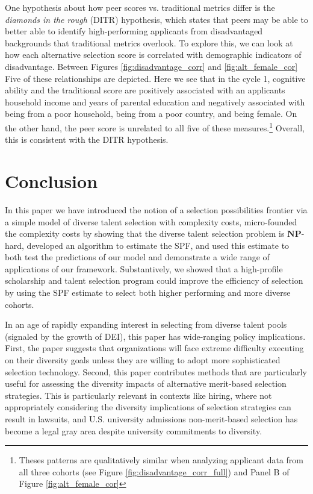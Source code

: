One hypothesis about how peer scores vs. traditional metrics differ is the \emph{diamonds in the rough} (DITR) hypothesis, which states that peers may be able to better able to identify high-performing applicants from disadvantaged backgrounds that traditional metrics overlook. To explore this, we can look at how each alternative selection score is correlated with demographic indicators of disadvantage. Between Figures \ref{fig:disadvantage_corr} and \ref{fig:alt_female_cor} Five of these relationships are depicted. Here we see that in the cycle 1, cognitive ability and the traditional score are positively associated with an applicants household income and years of parental education and negatively associated with being from a poor household, being from a poor country, and being female. On the other hand, the peer score is unrelated to all five of these measures.\footnote{Theses patterns are qualitatively similar when analyzing applicant data from all three cohorts (see Figure \ref{fig:disadvantage_corr_full}) and Panel B of Figure \ref{fig:alt_female_cor}} Overall, this is consistent with the DITR hypothesis. 

\section{Conclusion} \label{sec:conclusion}

In this paper we have introduced the notion of a selection possibilities frontier via a simple model of diverse talent selection with complexity costs, micro-founded the complexity costs by showing that the diverse talent selection problem is $\mathbf{NP}$-hard, developed an algorithm to estimate the SPF, and used this estimate to both test the predictions of our model and demonstrate a wide range of applications of our framework. Substantively, we showed that a high-profile scholarship and talent selection program could improve the efficiency of selection by using the SPF estimate to select both higher performing and more diverse cohorts. 

In an age of rapidly expanding interest in selecting from diverse talent pools (signaled by the growth of DEI), this paper has wide-ranging policy implications. First, the paper suggests that organizations will face extreme difficulty executing on their diversity goals unless they are willing to adopt more sophisticated selection technology. Second, this paper contributes methods that are particularly useful for assessing the diversity impacts of alternative merit-based selection strategies. This is particularly relevant in contexts like hiring, where not appropriately considering the diversity implications of selection strategies can result in lawsuits, and U.S. university admissions non-merit-based selection has become a legal gray area despite university commitments to diversity. 



